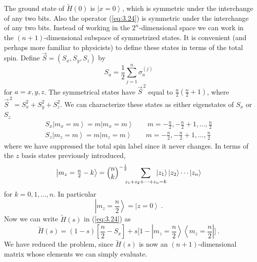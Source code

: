 \documentclass[twoside]{article}
\newcommand{\half}{{\textstyle{\frac12}}}
\newcommand{\ket}[1]{\left|#1\right\rangle}
\newcommand{\bra}[1]{\left\langle#1\right|}
\newcommand{\numEq}[2]{\begin{equation}
   \label{eq:#1}
   #2\end{equation}}
\newcommand{\refEq}[1]{(\ref{eq:#1})}
\newcommand{\fract}[2]{{\textstyle\frac#1#2}}
\let\tilde\widetilde
\numberwithin{equation}{section}
\begin{document}
The ground state of $\tilde H (0)$ is $\ket{x=0}$, which is symmetric under
the interchange of any two bits.  Also the operator \refEq{3.24} is
symmetric under the interchange of any two bits.  Instead of working in
the
$2^n$-dimensional space we can work in the \mbox{$(n+1)$}-dimensional
subspace of symmetrized states.  It is convenient (and perhaps more
familiar to physicists) to define these states in terms of the total spin. 
Define $\vec S = (S_x, S_y, S_z)$ by
\numEq{3.25}{ S_a = \half \sum^n_{j=1} \sigma^{(j)}_a } for $a=x,y,z$.  The
symmetrical states have $\vec{S}^{\, 2}$ equal to
$\frac{n}{2} (\frac{n}{2} +1)$, where $\vec{S}^{\, 2} = S_x^2 + S_y^2 +
S_z^2$.  We can characterize these states as either eigenstates of $S_x$ or
$S_z$
\begin{align} S_x \ket{m_x=m} = m\ket{m_x=m} \qquad m =  -\fract{n}{2},
-\fract{n}{2} +1, \dots,\fract{n}{2} \nonumber\\[.5ex]
 S_z \ket{m_z=m} =
m\ket{m_z=m} \qquad m =  -\fract{n}{2}, -\fract{n}{2} +1,
\dots,\fract{n}{2} 
\label{eq:3.26}
\end{align} where we have suppressed the total spin label since it never
changes.  In terms of the $z$ basis states previously introduced,
\numEq{3.27}{
\ket{m_z=\fract{n}{2}-k} = 
\Bigl(\begin{matrix} n \\ k \end{matrix}\Bigr)^{-\frac12}\mkern-10mu
\sum_{z_1+z_2+\cdots+ z_n=k}\mkern-30mu \ket{z_1} \ket{z_2}
\cdots \ket{z_n} } for
$k=0,1,\dots,n$.  In particular
\numEq{3.28}{
\ket{m_z=\fract{n}{2}} = \ket{z=0}\ . } Now we can write $\tilde H(s)$ in
\refEq{3.24} as
\numEq{3.29}{
\tilde H(s) = (1-s) \left[\fract{n}{2}-S_x \right] +
s\bigl[1-\ket{m_z=\fract{n}{2}}
\bra{m_z=\fract{n}{2}}\bigr] \ . } We have reduced the problem, since
$\tilde H(s)$ is now an
$(n+1)$-dimensional matrix whose elements we can simply evaluate.
\end{document}
